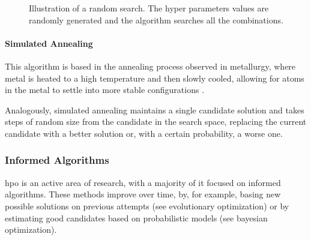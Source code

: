 \begin{figure}[h]
	\centering
    \caption{Illustration of a random search. The hyper parameters values are randomly generated and the algorithm searches all the combinations.}
    \label{random}
 \end{figure}

\paragraph{Simulated Annealing}

This algorithm is based in the annealing process observed in metallurgy, where metal is heated to a high temperature and then slowly cooled, allowing for atoms in the metal to settle into more stable configurations \parencite{elshawi2019automated}.

Analogously, simulated annealing maintains a single candidate solution and takes steps of random size from the candidate in the search space, replacing the current candidate with a better solution or, with a certain probability, a worse one.

\subsubsection{Informed Algorithms}

\acrshort{hpo} is an active area of research, with a majority of it focused on informed algorithms. These methods improve over time, by, for example, basing new possible solutions on previous attempts (see evolutionary optimization) or by estimating good candidates based on probabilistic models (see bayesian optimization).

